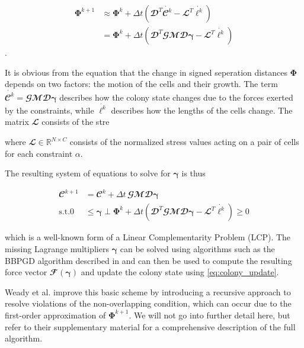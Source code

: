 \documentclass[conference]{IEEEtran}
\begin{document}
\begin{align}
    \mathbf{\Phi}^{k+1} & \approx \mathbf{\Phi}^k + \Delta t (\mathbfcal{D}^T \dot{\mathbfcal{C}^k} - \mathbfcal{L}^T \dot{\boldsymbol{\ell}^k})                                   \\
                        & = \mathbf{\Phi}^k + \Delta t (\mathbfcal{D}^T \mathbfcal{G} \mathbfcal{M} \mathbfcal{D} \boldsymbol{\gamma} - \mathbfcal{L}^T \dot{\boldsymbol{\ell}^k})
\end{align}.

It is obvious from the equation that the change in signed seperation distances $\mathbf{\Phi}$ depends on two factors: the motion of the cells and their growth. The term $\dot{\mathbfcal{C}^k} = \mathbfcal{G} \mathbfcal{M} \mathbfcal{D} \boldsymbol{\gamma}$ describes how the colony state changes due to the forces exerted by the constraints, while $\dot{\boldsymbol{\ell}^k}$ describes how the lengths of the cells change. The matrix $\mathbfcal{L}$ consists of the stre

where $\mathbfcal{L} \in \mathbb{R}^{N \times C}$ consists of the normalized stress values acting on a pair of cells for each constraint $\alpha$.

The resulting system of equations to solve for $\boldsymbol{\gamma}$ is thus

\begin{align}
    \mathbfcal{C}^{k+1} & = \mathbfcal{C}^k + \Delta t \, \mathbfcal{G}\mathbfcal{M} \mathbfcal{D} \boldsymbol{\gamma}                                                                                                 \\
    \text{s.t.} 0       & \leq \boldsymbol{\gamma} \perp \mathbf{\Phi}^k + \Delta t (\mathbfcal{D}^T \mathbfcal{G} \mathbfcal{M} \mathbfcal{D} \boldsymbol{\gamma} - \mathbfcal{L}^T \dot{\boldsymbol{\ell}^k}) \geq 0
\end{align}

which is a well-known form of a Linear Complementarity Problem (LCP). The missing Lagrange multipliers $\boldsymbol{\gamma}$ can be solved using algorithms such as the BBPGD algorithm described in \cite{Weady2024} and can then be used to compute the resulting force vector $\mathbfcal{F}(\boldsymbol{\gamma})$ and update the colony state using \autoref{eq:colony_update}.

Weady et al. \cite{Weady2024} improve this basic scheme by introducing a recursive approach to resolve violations of the non-overlapping condition, which can occur due to the first-order approximation of $\mathbf{\Phi}^{k+1}$. We will not go into further detail here, but refer to their supplementary material for a comprehensive description of the full algorithm.
\end{document}
